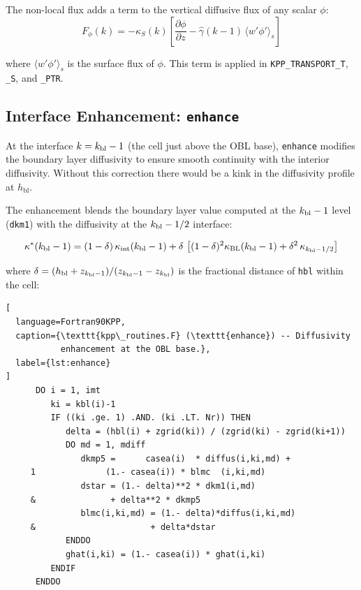 \documentclass[12pt,letterpaper]{article}
\newcommand{\hbl}{h_{\mathrm{bl}}}
\newcommand{\ghat}{\hat{\gamma}}
\begin{document}
The non-local flux adds a term to the vertical diffusive flux of any  
scalar $\phi$:  
\begin{equation}  
F_\phi(k) = -\kappa_S(k)\left[\frac{\partial \phi}{\partial z}  
             - \ghat(k-1)\,\langle w'\phi'\rangle_s\right]  
\end{equation}  
  
where $\langle w'\phi'\rangle_s$ is the surface flux of $\phi$. This  
term is applied in \texttt{KPP\_TRANSPORT\_T}, \texttt{\_S}, and  
\texttt{\_PTR}.  
  
\subsection{Interface Enhancement: \texttt{enhance}}  
\label{subsec:enhance}  
  
At the interface $k = k_{\rm bl} - 1$ (the cell just above the  
OBL base), \texttt{enhance} modifies the boundary layer diffusivity  
to ensure smooth continuity with the interior diffusivity. Without this  
correction there would be a kink in the diffusivity profile at $\hbl$.  
  
The enhancement blends the boundary layer value computed at the  
$k_{\rm bl}-1$ level (\texttt{dkm1}) with the diffusivity at the  
$k_{\rm bl}-1/2$ interface:  
  
\begin{equation}  
\kappa^*(k_{\rm bl}-1) = (1-\delta)\,\kappa_{\rm int}(k_{\rm bl}-1)  
+ \delta\,\left[(1-\delta)^2 \kappa_{\rm BL}(k_{\rm bl}-1)  
+ \delta^2\,\kappa_{k_{\rm bl}-1/2}\right]  
\end{equation}  
  
where $\delta = (\hbl + z_{k_{\rm bl}-1}) / (z_{k_{\rm bl}-1} -  
z_{k_{\rm bl}})$ is the fractional distance of \texttt{hbl} within  
the cell:  
  
\begin{lstlisting}[  
  language=Fortran90KPP,  
  caption={\texttt{kpp\_routines.F} (\texttt{enhance}) -- Diffusivity  
           enhancement at the OBL base.},  
  label={lst:enhance}  
]  
      DO i = 1, imt  
         ki = kbl(i)-1  
         IF ((ki .ge. 1) .AND. (ki .LT. Nr)) THEN  
            delta = (hbl(i) + zgrid(ki)) / (zgrid(ki) - zgrid(ki+1))  
            DO md = 1, mdiff  
               dkmp5 =      casea(i)  * diffus(i,ki,md) +  
     1              (1.- casea(i)) * blmc  (i,ki,md)  
               dstar = (1.- delta)**2 * dkm1(i,md)  
     &               + delta**2 * dkmp5  
               blmc(i,ki,md) = (1.- delta)*diffus(i,ki,md)  
     &                       + delta*dstar  
            ENDDO  
            ghat(i,ki) = (1.- casea(i)) * ghat(i,ki)  
         ENDIF  
      ENDDO  
\end{lstlisting}  
  
\end{document}
